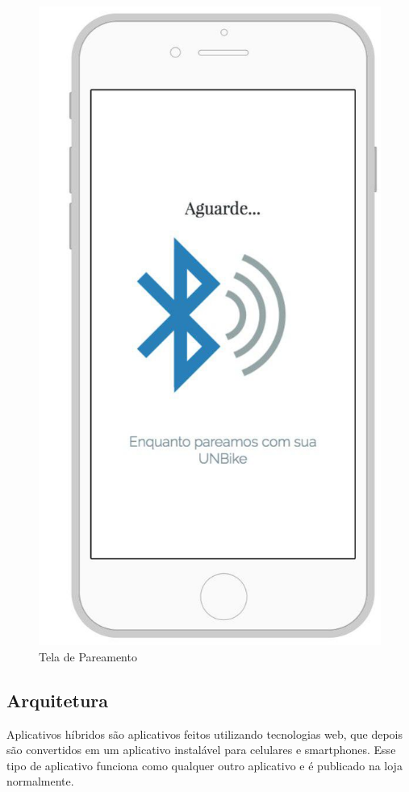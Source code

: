 \begin{figure}[!htb]
	\centering
	\includegraphics[scale=0.50]{tela_pareamento.jpg}
	\caption{Tela de Pareamento}
	\label{img:telapareamento}
\end{figure}

	\subsection{Arquitetura}
	Aplicativos híbridos são aplicativos feitos utilizando tecnologias web, que depois são convertidos em um aplicativo instalável para celulares e smartphones. Esse tipo de aplicativo funciona como qualquer outro aplicativo e é publicado na loja normalmente.

